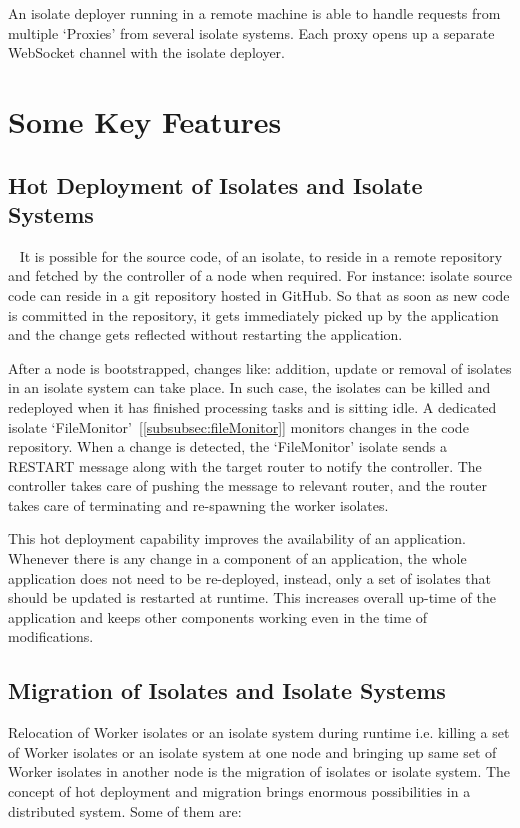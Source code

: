   An isolate deployer running in a remote machine is able to handle requests from multiple ‘Proxies’ from several isolate systems. Each proxy opens up a separate WebSocket channel with the isolate deployer.

\section{Some Key Features}
\subsection{Hot Deployment of Isolates and Isolate Systems}
~\label{subsec:hotDeployment}
It is possible for the source code, of an isolate, to reside in a remote repository and fetched by the controller of a node when required. For instance: isolate source code can reside in a git repository hosted in GitHub. So that as soon as new code is committed in the repository, it gets immediately picked up by the application and the change gets reflected without restarting the application.

  After a node is bootstrapped, changes like: addition, update or removal of isolates in an isolate system can take place. In such case, the isolates can be killed and redeployed when it has finished processing tasks and is sitting idle. A dedicated isolate ‘FileMonitor’~[\autoref{subsubsec:fileMonitor}] monitors changes in the code repository. When a change is detected, the ‘FileMonitor’ isolate sends a RESTART message along with the target router to notify the controller. The controller takes care of pushing the message to relevant router, and the router takes care of terminating and re-spawning the worker isolates.

  This hot deployment capability improves the availability of an application. Whenever there is any change in a component of an application, the whole application does not need to be re-deployed, instead, only a set of isolates that should be updated is restarted at runtime. This increases overall up-time of the application and keeps other components working even in the time of modifications.

\subsection{Migration of Isolates and Isolate Systems}
  Relocation of Worker isolates or an isolate system during runtime i.e. killing a set of Worker isolates or an isolate system at one node and bringing up same set of Worker isolates in another node is the migration of isolates or isolate system. The concept of hot deployment and migration brings enormous possibilities in a distributed system. Some of them are:

